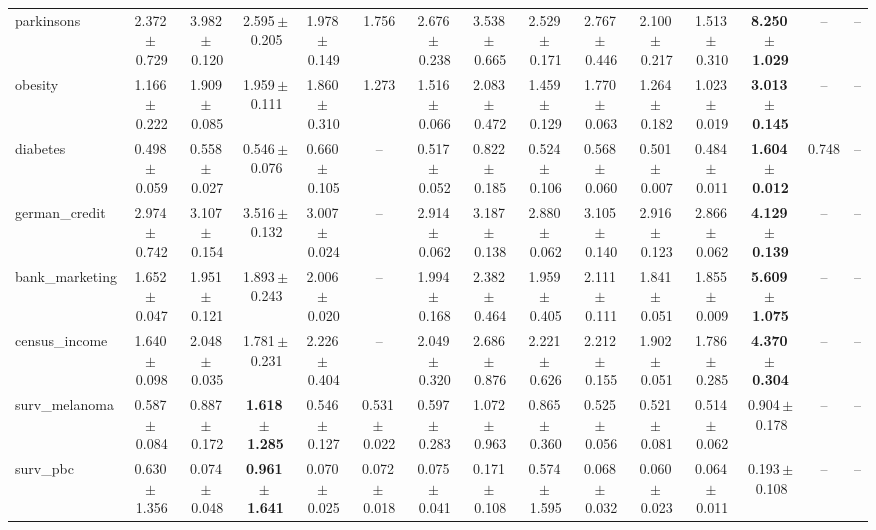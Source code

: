 \documentclass[8pt]{extarticle}
\begin{document}
\begin{longtable}{l*{14}{c}}
parkinsons & 2.372\,$\pm$\,0.729 & 3.982\,$\pm$\,0.120 & 2.595\,$\pm$\,0.205 & 1.978\,$\pm$\,0.149 & 1.756 & 2.676\,$\pm$\,0.238 & 3.538\,$\pm$\,0.665 & 2.529\,$\pm$\,0.171 & 2.767\,$\pm$\,0.446 & 2.100\,$\pm$\,0.217 & 1.513\,$\pm$\,0.310 & \textbf{8.250\,$\pm$\,1.029} & -- & -- \\
obesity & 1.166\,$\pm$\,0.222 & 1.909\,$\pm$\,0.085 & 1.959\,$\pm$\,0.111 & 1.860\,$\pm$\,0.310 & 1.273 & 1.516\,$\pm$\,0.066 & 2.083\,$\pm$\,0.472 & 1.459\,$\pm$\,0.129 & 1.770\,$\pm$\,0.063 & 1.264\,$\pm$\,0.182 & 1.023\,$\pm$\,0.019 & \textbf{3.013\,$\pm$\,0.145} & -- & -- \\
diabetes & 0.498\,$\pm$\,0.059 & 0.558\,$\pm$\,0.027 & 0.546\,$\pm$\,0.076 & 0.660\,$\pm$\,0.105 & -- & 0.517\,$\pm$\,0.052 & 0.822\,$\pm$\,0.185 & 0.524\,$\pm$\,0.106 & 0.568\,$\pm$\,0.060 & 0.501\,$\pm$\,0.007 & 0.484\,$\pm$\,0.011 & \textbf{1.604\,$\pm$\,0.012} & 0.748 & -- \\
german\_credit & 2.974\,$\pm$\,0.742 & 3.107\,$\pm$\,0.154 & 3.516\,$\pm$\,0.132 & 3.007\,$\pm$\,0.024 & -- & 2.914\,$\pm$\,0.062 & 3.187\,$\pm$\,0.138 & 2.880\,$\pm$\,0.062 & 3.105\,$\pm$\,0.140 & 2.916\,$\pm$\,0.123 & 2.866\,$\pm$\,0.062 & \textbf{4.129\,$\pm$\,0.139} & -- & -- \\
bank\_marketing & 1.652\,$\pm$\,0.047 & 1.951\,$\pm$\,0.121 & 1.893\,$\pm$\,0.243 & 2.006\,$\pm$\,0.020 & -- & 1.994\,$\pm$\,0.168 & 2.382\,$\pm$\,0.464 & 1.959\,$\pm$\,0.405 & 2.111\,$\pm$\,0.111 & 1.841\,$\pm$\,0.051 & 1.855\,$\pm$\,0.009 & \textbf{5.609\,$\pm$\,1.075} & -- & -- \\
census\_income & 1.640\,$\pm$\,0.098 & 2.048\,$\pm$\,0.035 & 1.781\,$\pm$\,0.231 & 2.226\,$\pm$\,0.404 & -- & 2.049\,$\pm$\,0.320 & 2.686\,$\pm$\,0.876 & 2.221\,$\pm$\,0.626 & 2.212\,$\pm$\,0.155 & 1.902\,$\pm$\,0.051 & 1.786\,$\pm$\,0.285 & \textbf{4.370\,$\pm$\,0.304} & -- & -- \\
surv\_melanoma & 0.587\,$\pm$\,0.084 & 0.887\,$\pm$\,0.172 & \textbf{1.618\,$\pm$\,1.285} & 0.546\,$\pm$\,0.127 & 0.531\,$\pm$\,0.022 & 0.597\,$\pm$\,0.283 & 1.072\,$\pm$\,0.963 & 0.865\,$\pm$\,0.360 & 0.525\,$\pm$\,0.056 & 0.521\,$\pm$\,0.081 & 0.514\,$\pm$\,0.062 & 0.904\,$\pm$\,0.178 & -- & -- \\
surv\_pbc & 0.630\,$\pm$\,1.356 & 0.074\,$\pm$\,0.048 & \textbf{0.961\,$\pm$\,1.641} & 0.070\,$\pm$\,0.025 & 0.072\,$\pm$\,0.018 & 0.075\,$\pm$\,0.041 & 0.171\,$\pm$\,0.108 & 0.574\,$\pm$\,1.595 & 0.068\,$\pm$\,0.032 & 0.060\,$\pm$\,0.023 & 0.064\,$\pm$\,0.011 & 0.193\,$\pm$\,0.108 & -- & -- \\

\end{longtable}
\end{document}
